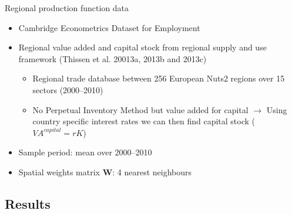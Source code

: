 \documentclass[presentation]{beamer}
\begin{document}
\begin{frame}{Regional production function data}
\begin{itemize}
	\item Cambridge Econometrics Dataset for Employment
	\item Regional value added and capital stock from regional supply and use framework (Thissen et al. 20013a, 2013b and 2013c) 
	\begin{itemize}
		\item Regional trade database between 256 European Nuts2 regions over 15 sectors (2000--2010)
		\item No Perpetual Inventory Method but value added for capital $\rightarrow$ Using country specific interest rates we can then find capital stock ($VA^{capital} = rK$)
	\end{itemize}
	\item Sample period: mean over 2000--2010
	\item Spatial weights matrix $\mathbf{W}$: 4 nearest neighbours
\end{itemize}
\end{frame}

\subsection{Results}
\end{document}
